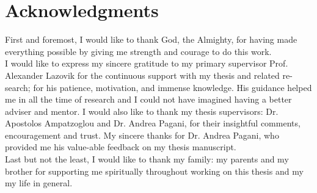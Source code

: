 
\begingroup
\let\clearpage\relax
\let\cleardoublepage\relax
\let\cleardoublepage\relax
\chapter*{Acknowledgments}
First and foremost, I would like to thank God, the Almighty, for having made everything possible by giving me strength and courage to do this work.\\

\noindent
I would like to express my sincere gratitude to my primary supervisor Prof. Alexander Lazovik for the continuous support with my thesis and related re- search; for his patience, motivation, and immense knowledge. His guidance helped me in all the time of research and I could not have imagined having a better adviser and mentor. I would also like to thank my thesis supervisors: Dr. Apostolos Ampatzoglou and Dr. Andrea Pagani, for their insightful comments, encouragement and trust. My sincere thanks for Dr. Andrea Pagani, who provided me his value-able feedback on my thesis manuscript.\\

\noindent
Last but not the least, I would like to thank my family: my parents and my brother for supporting me spiritually throughout working on this thesis and my my life in general.
\endgroup



